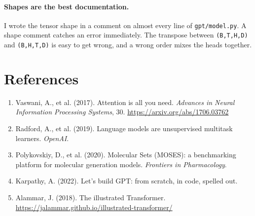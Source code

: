 \documentclass[11pt,a4paper]{article}
\newcommand{\code}[1]{\texttt{#1}}
\begin{document}
\paragraph{Shapes are the best documentation.} I wrote the tensor shape in a comment on almost
every line of \code{gpt/model.py}. A shape comment catches an error immediately. The transpose
between \code{(B,T,H,D)} and \code{(B,H,T,D)} is easy to get wrong, and a wrong order mixes the
heads together.

\section*{References}

\begin{enumerate}[leftmargin=1.8em]
  \item Vaswani, A., et al. (2017). Attention is all you need. \emph{Advances in Neural
        Information Processing Systems}, 30. \url{https://arxiv.org/abs/1706.03762}
  \item Radford, A., et al. (2019). Language models are unsupervised multitask learners.
        \emph{OpenAI}.
  \item Polykovskiy, D., et al. (2020). Molecular Sets (MOSES): a benchmarking platform for
        molecular generation models. \emph{Frontiers in Pharmacology}.
  \item Karpathy, A. (2022). Let's build GPT: from scratch, in code, spelled out.
  \item Alammar, J. (2018). The illustrated Transformer.
        \url{https://jalammar.github.io/illustrated-transformer/}
\end{enumerate}
\end{document}
